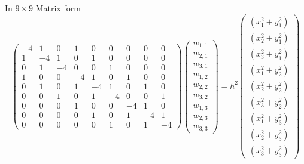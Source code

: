 In $9\times 9$ Matrix form
\[\left(\begin{array}{ccccccccc}
-4& 1 & 0 &1 &0 &0 &0 &0 &0\\
1&-4& 1 & 0 &1 &0 &0 &0 &0 \\
0 &1&-4&  0&0 &1 &0 &0 &0 \\
1 &0 &0 &-4& 1 & 0 &1 &0 &0\\
0 & 1 &0 &1&-4& 1 &0 &1 &0  \\
0 &0 &1 &0 &1&-4&0&  0 &1  \\
0&0&0&1 &0 &0 &-4& 1 & 0\\
0&0&0&0 & 1 &0 &1&-4& 1   \\
0&0&0&0 &0 &1 &0 &1&-4
\end{array}\right)
\left(\begin{array}{c}
w_{1,1}\\
w_{2,1}\\
w_{3,1}\\
w_{1,2}\\
w_{2,2}\\
w_{3,2}\\
w_{1,3}\\
w_{2,3}\\
w_{3,3}
\end{array}\right)=
h^2\left(\begin{array}{c}
(x_1^2+y_1^2)\\
(x_2^2+y_1^2)\\
(x_3^2+y_1^2)\\
(x_1^2+y_2^2)\\
(x_2^2+y_2^2)\\
(x_3^2+y_2^2)\\
(x_1^2+y_3^2)\\
(x_2^2+y_3^2)\\
(x_3^2+y_3^2)
\end{array}\right)
\]	

